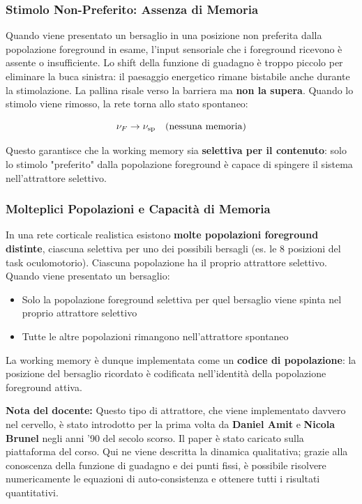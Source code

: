 \subsubsection{Stimolo Non-Preferito: Assenza di Memoria}

Quando viene presentato un bersaglio in una posizione non preferita dalla popolazione foreground in esame, l'input sensoriale che i foreground ricevono è assente o insufficiente. Lo shift della funzione di guadagno è troppo piccolo per eliminare la buca sinistra: il paesaggio energetico rimane bistabile anche durante la stimolazione. La pallina risale verso la barriera ma \textbf{non la supera}. Quando lo stimolo viene rimosso, la rete torna allo stato spontaneo:

\begin{equation}
\nu_F \to \nu_{\rm sp} \quad \text{(nessuna memoria)}
\end{equation}

Questo garantisce che la working memory sia \textbf{selettiva per il contenuto}: solo lo stimolo "preferito" dalla popolazione foreground è capace di spingere il sistema nell'attrattore selettivo.

\subsubsection{Molteplici Popolazioni e Capacità di Memoria}

In una rete corticale realistica esistono \textbf{molte popolazioni foreground distinte}, ciascuna selettiva per uno dei possibili bersagli (es. le 8 posizioni del task oculomotorio). Ciascuna popolazione ha il proprio attrattore selettivo. Quando viene presentato un bersaglio:

\begin{itemize}
    \item Solo la popolazione foreground selettiva per quel bersaglio viene spinta nel proprio attrattore selettivo
    \item Tutte le altre popolazioni rimangono nell'attrattore spontaneo
\end{itemize}

La working memory è dunque implementata come un \textbf{codice di popolazione}: la posizione del bersaglio ricordato è codificata nell'identità della popolazione foreground attiva.

\begin{tcolorbox}[colback=gray!5, colframe=gray!40, arc=2mm, boxrule=0.5pt]
\textbf{Nota del docente:} Questo tipo di attrattore, che viene implementato davvero nel cervello, è stato introdotto per la prima volta da \textbf{Daniel Amit} e \textbf{Nicola Brunel} negli anni '90 del secolo scorso. Il paper è stato caricato sulla piattaforma del corso. Qui ne viene descritta la dinamica qualitativa; grazie alla conoscenza della funzione di guadagno e dei punti fissi, è possibile risolvere numericamente le equazioni di auto-consistenza e ottenere tutti i risultati quantitativi.
\end{tcolorbox}


